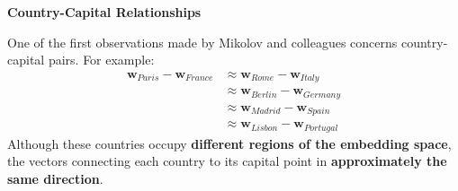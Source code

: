 \highspace
\begin{flushleft}
    \textcolor{Green3}{ \textbf{Country-Capital Relationships}}
\end{flushleft}
One of the first observations made by Mikolov and colleagues concerns country-capital pairs. For example:
\begin{align*}
    \mathbf{w}_{Paris} - \mathbf{w}_{France} &\approx
    \mathbf{w}_{Rome} - \mathbf{w}_{Italy} \\
    &\approx \mathbf{w}_{Berlin} - \mathbf{w}_{Germany} \\
    &\approx \mathbf{w}_{Madrid} - \mathbf{w}_{Spain} \\
    &\approx \mathbf{w}_{Lisbon} - \mathbf{w}_{Portugal}
\end{align*}
Although these countries occupy \textbf{different regions of the embedding space}, the vectors connecting each country to its capital point in \textbf{approximately the same direction}.

